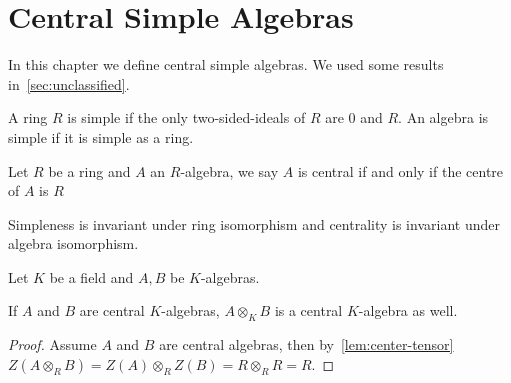 \chapter{Central Simple Algebras}\label{sec:csa}

In this chapter we define central simple algebras. We used some results in~\cref{sec:unclassified}.

\begin{definition} A ring $R$ is simple if the only two-sided-ideals of $R$ are ${0}$ and $R$. An algebra is simple if it is simple as a ring.
  \leanok
\end{definition}

\begin{definition}
  Let $R$ be a ring and $A$ an $R$-algebra, we say $A$ is central if and only if the centre of $A$ is $R$
  \leanok
\end{definition}

\begin{remark}
  Simpleness is invariant under ring isomorphism and centrality is invariant under algebra isomorphism.
\end{remark}

Let $K$ be a field and $A, B$ be $K$-algebras.
\begin{lemma}
  \label{lem:tensor-central}
  If $A$ and $B$ are central $K$-algebras, $A\otimes_{K}B$ is a central $K$-algebra as well.
  \leanok
\end{lemma}
\begin{proof}
  Assume $A$ and $B$ are central algebras, then by~\cref{lem:center-tensor}   $Z\left(A\otimes_{R}B\right)=Z\left(A\right)\otimes_{R}Z\left(B\right)=R\otimes_{R}R=R$.
\end{proof}


